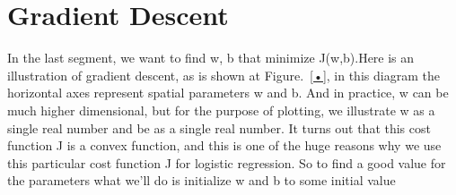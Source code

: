 \documentclass{article}
\begin{document}
\section{Gradient Descent}
\par In the last segment, we want to find w, b that minimize J(w,b).Here is an illustration of gradient descent, as is shown at Figure.~\ref{•}, in this diagram the horizontal axes represent spatial parameters w and b. And in practice, w can be much higher dimensional, but for the purpose of plotting, we illustrate w as a single real number and be as a single real number. It turns out that this cost function J is a convex function, and this is one of the huge reasons why we use this particular cost function J for logistic regression. So to find a good value for the parameters what we'll do is initialize w and b to some initial value
\end{document}
